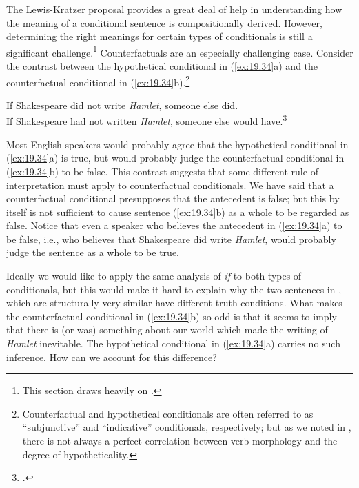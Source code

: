 The Lewis-Kratzer proposal provides a great deal of help in understanding how the meaning of a conditional sentence is compositionally derived. However, determining the right meanings for certain types of conditionals is still a significant challenge.\footnote{This section draws heavily on \citet{vonFintel2012}.} Counterfactuals are an especially challenging case. Consider the contrast between the hypothetical conditional in (\ref{ex:19.34}a) and the counterfactual conditional in (\ref{ex:19.34}b).\footnote{Counterfactual and hypothetical conditionals are often referred to as “subjunctive” and “indicative” conditionals, respectively; but as we noted in , there is not always a perfect correlation between verb morphology and the degree of hypotheticality.}


\ea \label{ex:19.34}
\ea  If Shakespeare did not write \textit{Hamlet}, someone else did.\\
\ex If Shakespeare had not written \textit{Hamlet}, someone else would have.\footnote{\citet{Morton2004}.}
                       \z
\z


Most English speakers would probably agree that the hypothetical conditional in (\ref{ex:19.34}a) is true, but would probably judge the counterfactual conditional in (\ref{ex:19.34}b) to be false. This contrast suggests that some different rule of interpretation must apply to counterfactual conditionals. We have said that a counterfactual conditional presupposes that the antecedent is false; but this by itself is not sufficient to cause sentence (\ref{ex:19.34}b) as a whole to be regarded as false. Notice that even a speaker who believes the antecedent in (\ref{ex:19.34}a) to be false, i.e., who believes that Shakespeare did write \textit{Hamlet}, would probably judge the sentence as a whole to be true.



Ideally we would like to apply the same analysis of \textit{if} to both types of conditionals, but this would make it hard to explain why the two sentences in , which are structurally very similar have different truth conditions. What makes the counterfactual conditional in (\ref{ex:19.34}b) so odd is that it seems to imply that there is (or was) something about our world which made the writing of \textit{Hamlet} inevitable. The hypothetical conditional in (\ref{ex:19.34}a) carries no such inference. How can we account for this difference?



